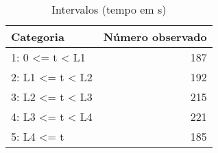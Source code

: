 \begin{table}[htbp]
\begin{center}
\begin{tabular}{|l|r|}
\hline
Categoria & \multicolumn{1}{l|}{Número observado} \\ \hline
1:  0 <= t < L1 & 187 \\ \hline
2: L1 <= t < L2 & 192 \\ \hline
3: L2 <= t < L3 & 215 \\ \hline
4: L3 <= t < L4 & 221 \\ \hline
5: L4 <= t & 185 \\ \hline
\end{tabular}
\end{center}
\caption{Intervalos (tempo em s)}
\label{tab:tabela4}
\end{table}

